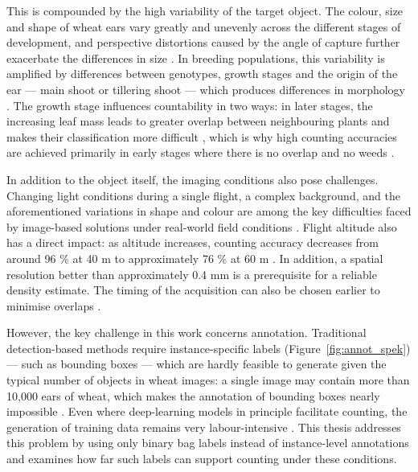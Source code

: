 \documentclass[12pt,parskip = half, DIV=classic,listof=totoc]{scrartcl}
\begin{document}
			This is compounded by the high variability of the target object. The colour, size and shape of wheat ears vary greatly and unevenly across the different stages of development, 
			and perspective distortions caused by the angle of capture further exacerbate the differences in size \cite{xiongTasselNetv2InfieldCounting2019}. 
			In breeding populations, this variability is amplified by differences between genotypes, growth stages and the origin of the ear — main shoot or tillering shoot — 
			which produces differences in morphology \cite{guoAerialImageryAnalysis2018}. The growth stage influences countability in two ways: in later stages, the 
			increasing leaf mass leads to greater overlap between neighbouring plants and makes their classification more difficult \cite{jinEstimatesPlantDensity2017a}, which is why high counting accuracies 
			are achieved primarily in early stages where there is no overlap and no weeds \cite{garcia-martinezDigitalCountCorn2020}.

			In addition to the object itself, the imaging conditions also pose challenges. Changing light conditions during a single flight, a complex background, 
			and the aforementioned variations in shape and colour are among the key difficulties faced by image-based solutions under real-world field conditions \cite{guoAerialImageryAnalysis2018}. 
			Flight altitude also has a direct impact: as altitude increases, counting accuracy decreases from around 96 \% at 40 m to approximately 76 \% at 60 m \cite{neupaneDeepLearningBased2019}.
			In addition, a spatial resolution better than approximately 0.4 mm is a prerequisite for a reliable density estimate. 
			The timing of the acquisition can also be chosen earlier to minimise overlaps \cite{jinEstimatesPlantDensity2017a}.

			However, the key challenge in this work concerns annotation. Traditional detection-based methods require instance-specific labels (Figure~\ref{fig:annot_spek}) --- such as bounding boxes ---
			which are hardly feasible to generate given the typical number of objects in wheat images: a single image may contain more than 10,000 ears of wheat, 
			which makes the annotation of bounding boxes nearly impossible \cite{xiongTasselNetv2InfieldCounting2019}. Even where deep-learning models in principle facilitate counting, 
			the generation of training data remains very labour-intensive \cite{guoAerialImageryAnalysis2018}. This thesis addresses this problem by using only binary bag 
			labels instead of instance-level annotations and examines how far such labels can support counting under these conditions. 
\end{document}
